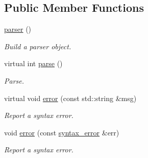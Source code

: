 \subsection*{Public Member Functions}
\begin{DoxyCompactItemize}
\item 
\hypertarget{classyy_1_1parser_a933976dee016ee0623704a75a53551a4}{}\hyperlink{classyy_1_1parser_a933976dee016ee0623704a75a53551a4}{parser} ()\label{classyy_1_1parser_a933976dee016ee0623704a75a53551a4}

\begin{DoxyCompactList}\small\item\em Build a parser object. \end{DoxyCompactList}\item 
virtual int \hyperlink{classyy_1_1parser_ac54cad6da907397a978922bfe246e6f8}{parse} ()
\begin{DoxyCompactList}\small\item\em Parse. \end{DoxyCompactList}\item 
virtual void \hyperlink{classyy_1_1parser_a3a740797fdf8f0ea046b20ffbc6c3f08}{error} (const std\+::string \&msg)
\begin{DoxyCompactList}\small\item\em Report a syntax error. \end{DoxyCompactList}\item 
\hypertarget{classyy_1_1parser_a55d4a04712e5fa9f33baed8f92b3eb05}{}void \hyperlink{classyy_1_1parser_a55d4a04712e5fa9f33baed8f92b3eb05}{error} (const \hyperlink{structyy_1_1parser_1_1syntax__error}{syntax\+\_\+error} \&err)\label{classyy_1_1parser_a55d4a04712e5fa9f33baed8f92b3eb05}

\begin{DoxyCompactList}\small\item\em Report a syntax error. \end{DoxyCompactList}\end{DoxyCompactItemize}
